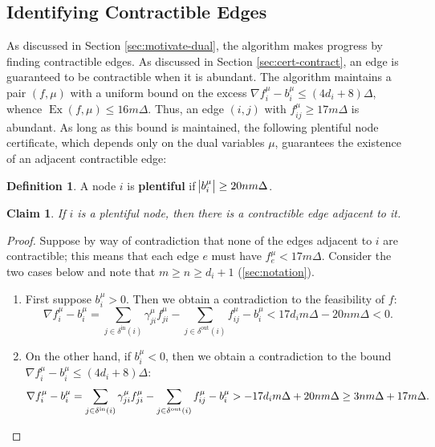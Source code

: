 \documentclass[11pt]{article}
\newtheorem{claim}[theorem]{Claim}
\theoremstyle{definition}
\newtheorem{definition}{Definition}[section]
\theoremstyle{definition}
\theoremstyle{definition}
\newcommand{\fu}{f^{\mu}}
\newcommand{\nfiu}{\nabla \fu_i}
\newcommand{\biu}{b_{i}^{\mu}}
\newcommand{\din}{\delta^{\text{in}}}
\newcommand{\dout}{\delta^{\text{out}}}
\DeclareMathOperator{\Ex}{Ex}
\begin{document}
\subsection{Identifying Contractible Edges}
\label{sec:findcontr2013}
As discussed in Section \ref{sec:motivate-dual},
the algorithm makes progress by finding contractible edges.
As discussed in Section \ref{sec:cert-contract}, an edge is guaranteed
to be contractible when it is abundant. The algorithm maintains a pair $(f, \mu)$ with
a uniform bound on the excess $\nfiu - \biu \leq (4d_i + 8)\Delta$, whence
$\Ex(f, \mu) \leq 16m\Delta$.
Thus, an edge $(i, j)$ with $f_{ij}^\mu \geq 17m\Delta$ is abundant.
As long as this bound is maintained, the following plentiful node certificate,
which depends only on the dual variables $\mu$, guarantees the existence
of an adjacent contractible edge:
\begin{definition}
A node $i$ is \textbf{plentiful} if $\abs{b_i^\mu} \geq 20nm\Delta$.
\end{definition}
\begin{claim}
If $i$ is a plentiful node, then there is a contractible edge adjacent to it.
\end{claim}
\begin{proof}
Suppose by way of contradiction that none of the edges adjacent to $i$ are
contractible; this means that each edge $e$ must have $f_e^\mu < 17m\Delta$.
Consider the two cases below and note that $m \geq n \geq d_i + 1$ (\ref{sec:notation}).
\begin{enumerate}[itemsep=0mm]
\item First suppose $b_i^\mu > 0$. Then we obtain a contradiction to the feasibility of $f$:
      \[ \nfiu - \biu = \sum_{j \in \din(i)} \gamma_{ji}^\mu f_{ji}^\mu -
	  \sum_{j \in \dout(i)} f_{ij}^\mu - b_i^\mu < 17d_im\Delta - 20nm\Delta < 0. \]
\item On the other hand, if $b_i^\mu < 0$, then we obtain a contradiction to the
      bound $\nfiu - \biu \leq (4d_i + 8)\Delta$:
	  \[ \nfiu - \biu = \sum_{j \in \din(i)} \gamma_{ji}^\mu f_{ji}^\mu -
		 \sum_{j \in \dout(i)} f_{ij}^\mu - b_i^\mu
         > -17d_im\Delta + 20nm\Delta \geq 3nm\Delta + 17m\Delta. \qedhere \]
\end{enumerate}
\end{proof}
\end{document}
